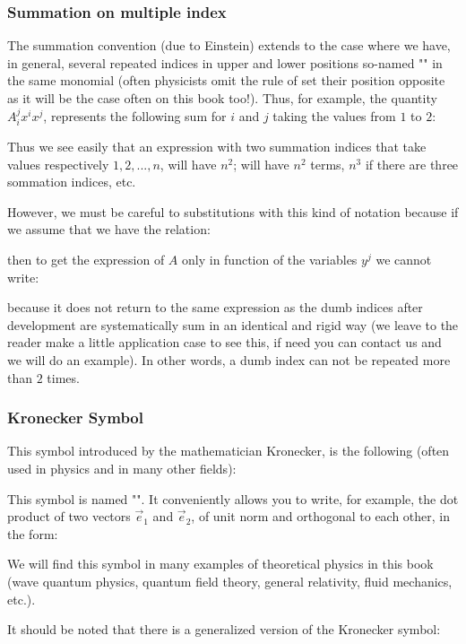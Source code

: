 	\pagebreak
	\subsubsection{Summation on multiple index}
	The summation convention (due to Einstein) extends to the case where we have, in general, several repeated indices in upper and lower positions so-named "" in the same monomial (often physicists omit the rule of set their position opposite as it will be the case often on this book too!). Thus, for example, the quantity $A_i^jx^ix^j$, represents the following sum for $i$ and $j$ taking the values from $1$ to $2$:
		
	Thus we see easily that an expression with two summation indices that take values respectively $1,2,...,n$, will have $n^2$; will have $n^2$ terms, $n^3$ if there are three sommation indices, etc.
	
	However, we must be careful to substitutions with this kind of notation because if we assume that we have the relation:
	
	then to get the expression of $A$ only in function of the variables $y^j$ we cannot write:
	
	because it does not return to the same expression as the dumb indices after development are systematically sum in an identical and rigid way (we leave to the reader make a little application case to see this, if need you can contact us and we will do an example). In other words, a dumb index can not be repeated more than $2$ times.
	
	\subsubsection{Kronecker Symbol}
	This symbol introduced by the mathematician Kronecker, is the following (often used in physics and in many other fields):
	
	This symbol is named "". It conveniently allows you to write, for example, the dot product of two vectors $\vec{e}_1$ and $\vec{e}_2$, of unit norm and orthogonal to each other, in the form:
	
	We will find this symbol in many examples of theoretical physics in this book (wave quantum physics, quantum field theory, general relativity, fluid mechanics, etc.).
	
	It should be noted that there is a generalized version of the Kronecker symbol:
	
